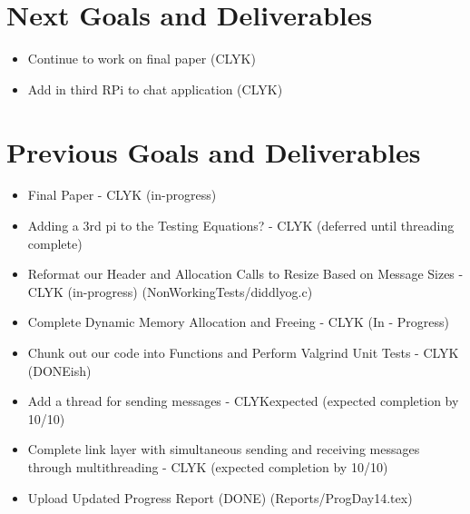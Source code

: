 \documentclass{article}
\begin{document}
\section*{Next Goals and Deliverables}
\begin{itemize}
\item Continue to work on final paper (CLYK)
\item Add in third RPi to chat application (CLYK)

\end{itemize}
\section*{Previous Goals and Deliverables}
\begin{itemize}
\item Final Paper - CLYK (in-progress)
\item Adding a 3rd pi to the Testing Equations? - CLYK (deferred until threading complete)
\item Reformat our Header and Allocation Calls to Resize Based on Message Sizes - CLYK (in-progress) (NonWorkingTests/diddlyog.c)
\item Complete Dynamic Memory Allocation and Freeing - CLYK (In - Progress)
\item Chunk out our code into Functions and Perform Valgrind Unit Tests - CLYK (DONEish)
\item Add a thread for sending messages - CLYKexpected (expected completion by 10/10)
\item Complete link layer with simultaneous sending and receiving messages through multithreading - CLYK (expected completion by 10/10)

\item Upload Updated Progress Report (DONE) (Reports/ProgDay14.tex)
\end{itemize}
\end{document}
